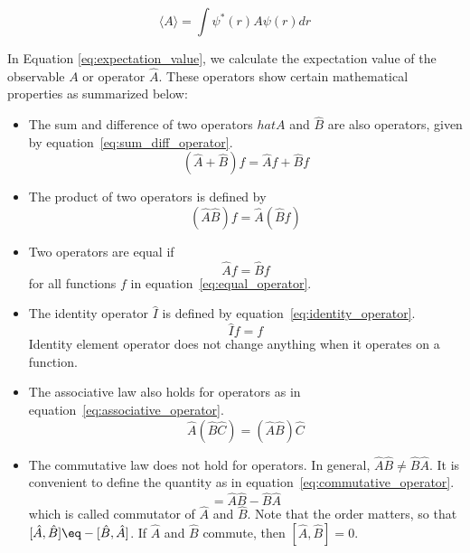 \begin{equation}
\langle A \rangle = \int \psi^{*}(r) A \psi(r) dr
\label{eq:expectation_value}
\end{equation}

In Equation \ref{eq:expectation_value}, we calculate the expectation value of the observable $A$ or operator $\hat{A}$. These operators show certain mathematical properties as summarized below:

\begin{itemize}
    \item The sum and difference of two operators $hat{A}$ and $\hat{B}$ are also operators, given by equation~\ref{eq:sum_diff_operator}.
        \begin{equation}
            (\hat{A} + \hat{B})f = \hat{A}f + \hat{B}f
            \label{eq:sum_diff_operator}
        \end{equation}
    \item The product of two operators is defined by 
        \begin{equation}
            (\hat{A}\hat{B})f = \hat{A}(\hat{B}f)
            \label{eq:product_operator}
        \end{equation}

    \item Two operators are equal if 
        \begin{equation}
            \hat{A}f = \hat{B}f
            \label{eq:equal_operator}
        \end{equation}
        for all functions $f$ in equation~\ref{eq:equal_operator}.

    \item The identity operator $\hat{I}$ is defined by equation~\ref{eq:identity_operator}.
        \begin{equation}
            \hat{I}f = f
            \label{eq:identity_operator}
        \end{equation}
          Identity element operator does not change anything when it operates on a function.
    \item The associative law also holds for operators as in equation~\ref{eq:associative_operator}.
        \begin{equation}
            \hat{A}(\hat{B}\hat{C}) = (\hat{A}\hat{B})\hat{C}
            \label{eq:associative_operator}
        \end{equation}
    \item The commutative law does not hold for operators. In general, $\hat{A}\hat{B} \neq \hat{B}\hat{A}$.  It is convenient to define the quantity as in equation~\ref{eq:commutative_operator}.
        \begin{equation}
            [\hat{A}, \hat{B}] = \hat{A}\hat{B} - \hat{B}\hat{A}
            \label{eq:commutator_operator}
        \end{equation}
          which is called commutator of $\hat{A}$ and $\hat{B}$. Note that the order matters, so that $[\hat{A}, \hat{B}] \eq -[\hat{B}, \hat{A}]$. If $\hat{A}$ and $\hat{B}$ commute, then $[\hat{A}, \hat{B}] = 0$.

  \end{itemize}


